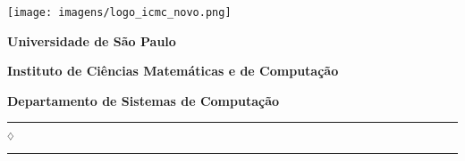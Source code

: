 \begin{center}
        
        \begin{minipage}[c]{\textwidth}
          \parbox[c]{2cm}{
              \begin{flushright}
              \texttt{[image: imagens/logo\_icmc\_novo.png]}
              \end{flushright}
          }
          \parbox[c]{13cm}
            {
              \begin{center}
              \textbf{\Large Universidade de São Paulo}
        
              \vspace{0.07cm}
        
              \textbf{\large Instituto de Ciências Matemáticas e de Computação}
        
              \vspace{0.07cm}
        
              \textbf{\large Departamento de Sistemas de Computação}
              \vspace{0.07cm}
              \end{center}
            }
        \end{minipage}
        
        \vspace{-0.5cm}
        
        \rule{7.5cm}{0.03pc}{\tiny $_\diamondsuit$}\rule{7.5cm}{0.03pc}
\end{center}
        